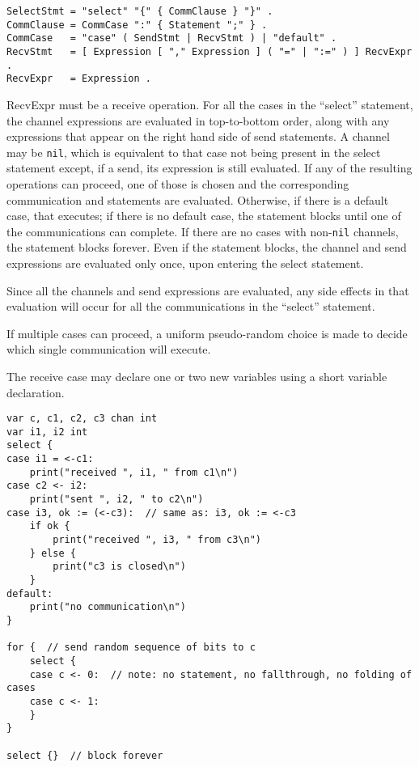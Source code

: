 {\begin{Verbatim}[frame=single]
SelectStmt = "select" "{" { CommClause } "}" .
CommClause = CommCase ":" { Statement ";" } .
CommCase   = "case" ( SendStmt | RecvStmt ) | "default" .
RecvStmt   = [ Expression [ "," Expression ] ( "=" | ":=" ) ] RecvExpr .
RecvExpr   = Expression .
\end{Verbatim}

RecvExpr must be a receive operation. For
all the cases in the ``select'' statement, the channel expressions are
evaluated in top-to-bottom order, along with any expressions that appear
on the right hand side of send statements. A channel may be
\texttt{nil}, which is equivalent to that case not being present in the
select statement except, if a send, its expression is still evaluated.
If any of the resulting operations can proceed, one of those is chosen
and the corresponding communication and statements are evaluated.
Otherwise, if there is a default case, that executes; if there is no
default case, the statement blocks until one of the communications can
complete. If there are no cases with non-\texttt{nil} channels, the
statement blocks forever. Even if the statement blocks, the channel and
send expressions are evaluated only once, upon entering the select
statement.

Since all the channels and send expressions are evaluated, any side
effects in that evaluation will occur for all the communications in the
``select'' statement.

If multiple cases can proceed, a uniform pseudo-random choice is made to
decide which single communication will execute.

The receive case may declare one or two new variables using a
short variable declaration.

\begin{Verbatim}[frame=single]
var c, c1, c2, c3 chan int
var i1, i2 int
select {
case i1 = <-c1:
    print("received ", i1, " from c1\n")
case c2 <- i2:
    print("sent ", i2, " to c2\n")
case i3, ok := (<-c3):  // same as: i3, ok := <-c3
    if ok {
        print("received ", i3, " from c3\n")
    } else {
        print("c3 is closed\n")
    }
default:
    print("no communication\n")
}

for {  // send random sequence of bits to c
    select {
    case c <- 0:  // note: no statement, no fallthrough, no folding of cases
    case c <- 1:
    }
}

select {}  // block forever
\end{Verbatim}

}
